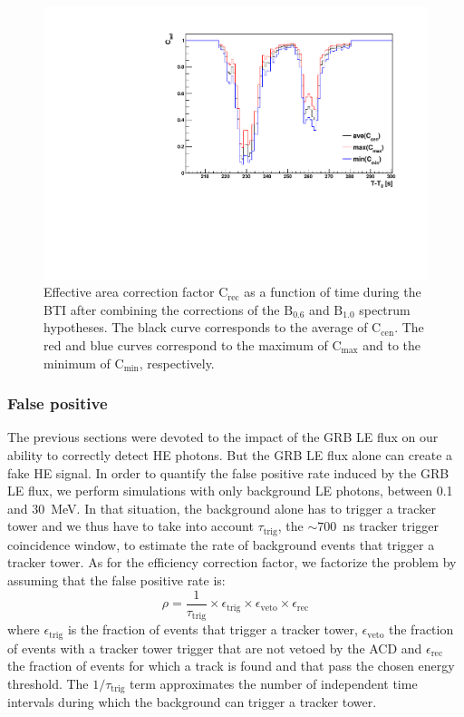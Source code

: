 \documentclass[preprint]{aastex631}
\begin{document}
\begin{figure}[t]
    \centering
    \includegraphics[width=0.6\linewidth]{paper_showMergePredictedEfficiency.pdf}
    \caption{Effective area correction factor $\mathrm{C}_\mathrm{rec}$ as a function of time during the BTI after combining the corrections of the $\mathrm{B}_{0.6}$ and $\mathrm{B}_{1.0}$ spectrum hypotheses. The black curve corresponds to the average of $\mathrm{C}_\mathrm{cen}$. The red and blue curves correspond to the maximum of $\mathrm{C}_\mathrm{max}$ and to the minimum of $\mathrm{C}_\mathrm{min}$, respectively.}
    \label{fig:EffCorSel}
\end{figure}

\subsubsection{False positive}
\label{sec:FalsePositive}

The previous sections were devoted to the impact of the GRB LE flux on our ability to correctly detect HE photons. But the GRB LE flux alone can create a fake HE signal. In order to quantify the false positive rate induced by the GRB LE flux, we perform simulations with only background LE photons, between 0.1 and 30~MeV. In that situation, the background alone has to trigger a tracker tower and we thus have to take into account $\tau_\mathrm{trig}$, the $\sim 700$~ns tracker trigger coincidence window, to estimate the rate of background events that trigger a tracker tower. As for the efficiency correction factor, we factorize the problem by assuming that the false positive rate is:
$$\rho = \frac{1}{\tau_\mathrm{trig}} \times \epsilon_\mathrm{trig} \times \epsilon_\mathrm{veto} \times \epsilon_\mathrm{rec} $$
where $\epsilon_\mathrm{trig}$ is the fraction of events that trigger a tracker tower, $\epsilon_\mathrm{veto}$ the fraction of events with a tracker tower trigger that are not vetoed by the ACD and $\epsilon_\mathrm{rec}$ the fraction of events for which a track is found and that pass the chosen energy threshold. The $1/\tau_\mathrm{trig}$ term approximates the number of independent time intervals during which the background can trigger a tracker tower.
\end{document}
